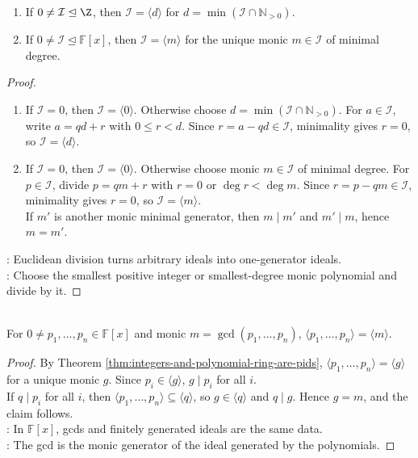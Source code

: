 \begin{theorem} \label{thm:integers-and-polynomial-ring-are-pids} 
\begin{enumerate}[label=(\roman*)]
\setlength{\itemsep}{0pt}
\item If $0\neq\mathcal{I}\trianglelefteq\Z$, then $\mathcal{I}=\langle d\rangle$ for $d=\min(\mathcal{I}\cap\mathbb{N}_{>0})$.
\item If $0\neq\mathcal{I}\trianglelefteq\mathbb{F}[x]$, then $\mathcal{I}=\langle m\rangle$ for the unique monic $m\in\mathcal{I}$ of minimal degree.
\end{enumerate}
\begin{proof}
\begin{enumerate}[label=(\roman*)]
\setlength{\itemsep}{0pt}
\item If $\mathcal{I}=0$, then $\mathcal{I}=\langle0\rangle$. Otherwise choose $d=\min(\mathcal{I}\cap\mathbb{N}_{>0})$. For $a\in\mathcal{I}$, write $a=qd+r$ with $0\leq r<d$. Since $r=a-qd\in\mathcal{I}$, minimality gives $r=0$, so $\mathcal{I}=\langle d\rangle$.
\item If $\mathcal{I}=0$, then $\mathcal{I}=\langle0\rangle$. Otherwise choose monic $m\in\mathcal{I}$ of minimal degree. For $p\in\mathcal{I}$, divide $p=qm+r$ with $r=0$ or $\deg r<\deg m$. Since $r=p-qm\in\mathcal{I}$, minimality gives $r=0$, so $\mathcal{I}=\langle m\rangle$.\\
If $m'$ is another monic minimal generator, then $m\mid m'$ and $m'\mid m$, hence $m=m'$.
\end{enumerate}
: Euclidean division turns arbitrary ideals into one-generator ideals.\\
: Choose the smallest positive integer or smallest-degree monic polynomial and divide by it.
\end{proof}
\end{theorem}

\begin{corollary} \label{cor:polynomial-generated-ideal-gcd} \\
For $0\neq p_1,\ldots,p_n\in\mathbb{F}[x]$ and monic $m=\gcd(p_1,\ldots,p_n)$, $\langle p_1,\ldots,p_n\rangle=\langle m\rangle$.
\begin{proof}
By Theorem \ref{thm:integers-and-polynomial-ring-are-pids}, $\langle p_1,\ldots,p_n\rangle=\langle g\rangle$ for a unique monic $g$. Since $p_i\in\langle g\rangle$, $g\mid p_i$ for all $i$.\\
If $q\mid p_i$ for all $i$, then $\langle p_1,\ldots,p_n\rangle\subseteq\langle q\rangle$, so $g\in\langle q\rangle$ and $q\mid g$. Hence $g=m$, and the claim follows.\\
: In $\mathbb{F}[x]$, gcds and finitely generated ideals are the same data.\\
: The gcd is the monic generator of the ideal generated by the polynomials.
\end{proof}
\end{corollary}

